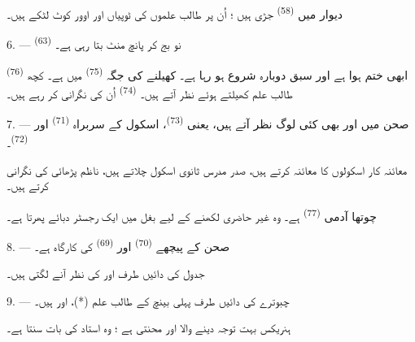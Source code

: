 دیوار میں  \textsuperscript{(58)} جڑی ہیں ؛ اُن پر طالب
علموں کی ٹوپیاں اور اوور کوٹ لٹکے ہیں۔

\VUsaut{5.2mm}
\VUsaut{3.6mm}

6. ---  \textsuperscript{(63)} نو بج کر پانچ منٹ بتا رہی
ہے۔

 \textsuperscript{(76)} ابھی ختم ہوا ہے اور سبق
دوبارہ شروع ہو رہا ہے۔ کھیلنے کی جگہ  \textsuperscript{(75)}
میں ہے۔ کچھ طالب علم کھیلتے ہوئے نظر آتے ہیں۔ 
\textsuperscript{(74)} اُن کی نگرانی کر رہے ہیں۔

7. --- صحن میں اور بھی کئی لوگ نظر آتے ہیں، یعنی 
\textsuperscript{(73)}، اسکول کے سربراہ 
\textsuperscript{(71)} اور  \textsuperscript{(72)}۔

معائنہ کار اسکولوں کا معائنہ کرتے ہیں، صدر مدرس ثانوی اسکول چلاتے
ہیں، ناظم پڑھائی کی نگرانی کرتے ہیں۔

چوتھا آدمی  \textsuperscript{(77)} ہے۔ وہ غیر حاضری
لکھنے کے لیے بغل میں ایک رجسٹر دبائے پھرتا ہے۔

8. --- صحن کے پیچھے  \textsuperscript{(70)} اور
 \textsuperscript{(69)} کی کارگاہ ہے۔

جدول کی دائیں طرف  اور  کی
 نظر آنے لگتی ہیں۔


\VUsaut{2.4mm}

\VUsaut{3.0mm}

9. --- چبوترے کی دائیں طرف پہلی بینچ کے طالب علم  (*)،
 اور  ہیں۔

ہنریکس بہت توجہ دینے والا اور محنتی ہے ؛ وہ استاد کی بات سنتا ہے۔

